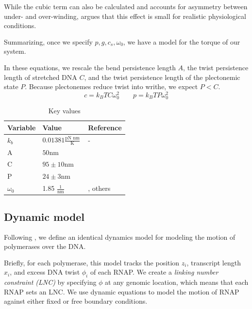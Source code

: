 \documentclass[11pt]{article}
\newcommand{\units}[2]{\frac{\text{#1}}{\text{#2}}\,}
\begin{document}
While the cubic term can also be calculated and accounts for asymmetry between under- and over-winding, \textcite{markoTorqueDynamicsLinking2007} argues that this effect is small for realistic physiological conditions.


Summarizing, once we specify \(p, g, c_s, \omega_0\), we have a model for the torque of our system.

In these equations, we rescale
the bend persistence length \(A\), the twist persistence length of stretched DNA \(C\), and the twist persistence length of the plectonemic
state \(P\). Because plectonemes reduce twist into writhe, we expect \(P < C\).
\[c = k_B T C \omega_0^2 \qquad p = k_B T P \omega_0^2\]

\begin{table}[h]
    \centering
    \begin{tabular}{@{}lll@{}}
        \toprule
        Variable & Value & Reference \\
        \midrule
        \(k_b\) & \(0.01381 \units{pN nm}{K}\) & - \\
        \midrule
        A & \(50\)nm & \parencite{markoTorqueDynamicsLinking2007} \\
        C & \(95 \pm 10\)nm & \parencite{markoTorqueDynamicsLinking2007} \\
        P & \(24 \pm 3\)nm & \parencite{markoTorqueDynamicsLinking2007} \\
        \(\omega_0\) & 1.85 \(\units{1}{nm}\) & \parencite{sevierPropertiesGeneExpression2018}, others \\
        \bottomrule
    \end{tabular}
    \caption{Key values}
    \label{tab:constants}
\end{table}


\subsection{Dynamic model}
Following \textcite{sevierPropertiesGeneExpression2018}, we define an identical dynamics model for modeling the motion of polymerases over the DNA.

Briefly, for each polymerase, this model tracks the position \(z_i\), transcript length \(x_i\), and excess DNA twist \(\phi_i\) of each RNAP. We create a \emph{linking number constraint (LNC)} by specifying \(\phi\) at any genomic location, which means that each RNAP sets an LNC. We use dynamic equations to model the motion of RNAP against either fixed or free boundary conditions.
\end{document}
